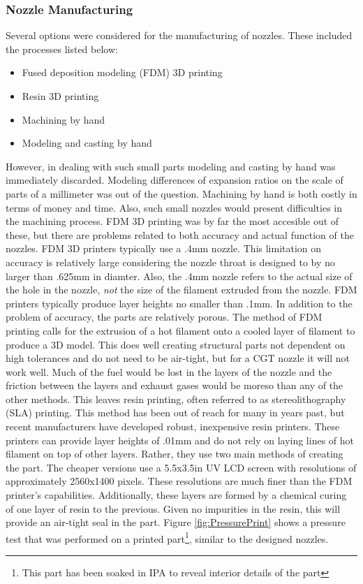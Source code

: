 \subsubsection{Nozzle Manufacturing}
Several options were considered for the manufacturing of nozzles. These included the processes listed below:
\begin{itemize}
\item Fused deposition modeling (FDM) 3D printing
\item Resin 3D printing
\item Machining by hand
\item Modeling and casting by hand
\end{itemize}
However, in dealing with such small parts modeling and casting by hand was immediately discarded. Modeling differences of expansion ratios on the scale of parts of a millimeter was out of the question. Machining by hand is both costly in terms of money and time. Also, such small nozzles would present difficulties in the machining process. FDM 3D printing was by far the most accesible out of these, but there are problems related to both accuracy and actual function of the nozzles. FDM 3D printers typically use a .4mm nozzle. This limitation on accuracy is relatively large considering the nozzle throat is designed to by no larger than .625mm in diamter. Also, the .4mm nozzle refers to the actual size of the hole in the nozzle, \textit{not} the size of the filament extruded from the nozzle. FDM printers typically produce layer heights no smaller than .1mm. In addition to the problem of accuracy, the parts are relatively porous. The method of FDM printing calls for the extrusion of a hot filament onto a cooled layer of filament to produce a 3D model. This does well creating structural parts not dependent on high tolerances and do not need to be air-tight, but for a CGT nozzle it will not work well. Much of the fuel would be lost in the layers of the nozzle and the friction between the layers and exhaust gases would be moreso than any of the other methods. This leaves resin printing, often referred to as stereolithography (SLA) printing. This method has been out of reach for many in years past, but recent manufacturers have developed robust, inexpensive resin printers. These printers can provide layer heights of .01mm and do not rely on laying lines of hot filament on top of other layers. Rather, they use two main methods of creating the part. The cheaper versions use a 5.5x3.5in UV LCD screen with resolutions of approximately 2560x1400 pixels. These resolutions are much finer than the FDM printer's capabilities. Additionally, these layers are formed by a chemical curing of one layer of resin to the previous. Given no impurities in the resin, this will provide an air-tight seal in the part. Figure \ref{fig:PressurePrint} shows a pressure test that was performed on a printed part\footnote{This part has been soaked in IPA to reveal interior details of the part}, similar to the designed nozzles.
